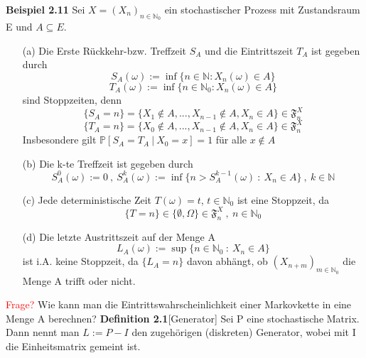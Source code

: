 \textbf{Beispiel 2.11}
Sei $X=(X_{n})_{n \in \mathbb{N}_{0}}$ ein stochastischer Prozess mit Zustandsraum E und $A \subseteq E$.
\begin{itemize}
\item[(a)] Die Erste Rückkehr-bzw. Treffzeit $S_{A}$ und die Eintrittszeit $T_{A}$ ist gegeben durch 
\begin{equation*}
S_{A}(\omega) := \inf \lbrace n \in \mathbb{N} : X_{n}(\omega) \in A \rbrace
\end{equation*}
\begin{equation*}
T_{A}(\omega) := \inf \lbrace n \in \mathbb{N}_{0} : X_{n}(\omega) \in A \rbrace
\end{equation*}
sind Stoppzeiten, denn
\begin{equation*}
\lbrace S_{A} = n \rbrace = \lbrace X_{1} \notin A,...,X_{n-1} \notin A, X_{n} \in A  \rbrace \in \mathfrak{F}_{n}^{X}
\end{equation*}
\begin{equation*}
\lbrace T_{A} = n \rbrace = \lbrace X_{0} \notin A,...,X_{n-1} \notin A, X_{n} \in A  \rbrace \in \mathfrak{F}_{n}^{X}
\end{equation*}
Insbesondere gilt $\mathbb{P}[S_{A} = T_{A} \: | \: X_{0} = x] = 1$ für alle $x \notin A$
\item[(b)] Die k-te Treffzeit ist gegeben durch 
\begin{equation*}
S_{A}^{0}(\omega) := 0 \: , \: S_{A}^{k}(\omega) := \inf \lbrace n> S_{A}^{k-1}(\omega) \: : \: X_{n} \in A \rbrace \: , \: k \in \mathbb{N}
\end{equation*}
\item[(c)] Jede deterministische Zeit $T(\omega) = t$, $t \in \mathbb{N}_{0}$ ist eine Stoppzeit, da
\begin{equation*}
\lbrace T = n \rbrace \in \lbrace \emptyset, \Omega \rbrace  \in \mathfrak{F}_{n}^{X} \:,\: n \in \mathbb{N}_{0} 
\end{equation*}
\item[(d)] Die letzte Austrittszeit auf der Menge A 
\begin{equation*}
L_{A}(\omega) := \sup \lbrace n \in \mathbb{N}_{0} \: : \: X_{n} \in A \rbrace
\end{equation*}
ist i.A. keine Stoppzeit, da $\lbrace L_{A} = n \rbrace$ davon abhängt, ob $(X_{n+m})_{m \in \mathbb{N}_{0}}$ die Menge A trifft oder nicht.
\end{itemize}

\noindent
\textcolor{red}{Frage?} Wie kann man die Eintrittswahrscheinlichkeit einer Markovkette in eine Menge A berechnen?
\textbf{Definition 2.1}[Generator]
Sei P eine stochastische Matrix. Dann nennt man $L := P-I$ den zugehörigen (diskreten) Generator, wobei mit I die Einheitsmatrix gemeint ist.



